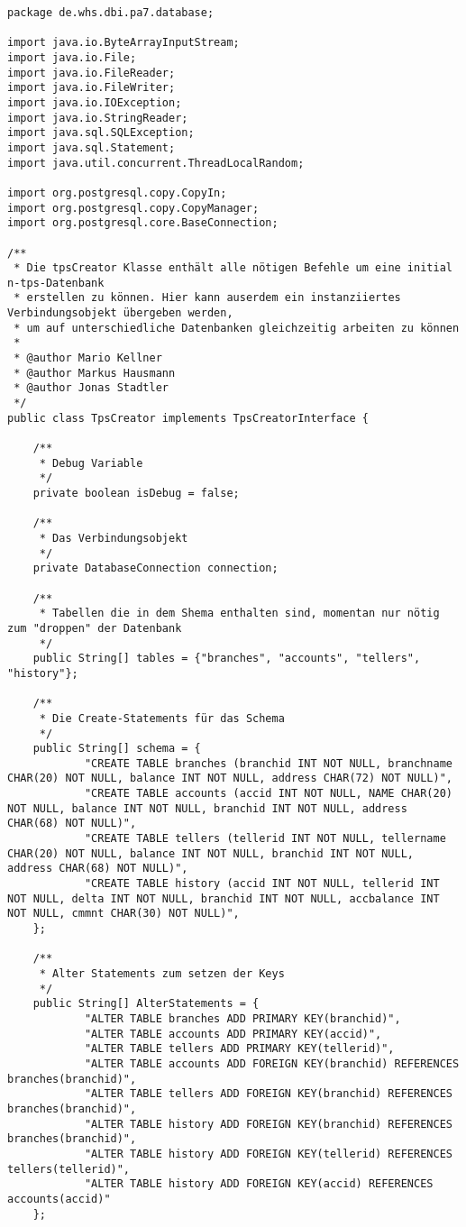 \begin{lstlisting}[caption={tpsCreator (optimiert)}, label={lst:tpsv2}]
package de.whs.dbi.pa7.database;

import java.io.ByteArrayInputStream;
import java.io.File;
import java.io.FileReader;
import java.io.FileWriter;
import java.io.IOException;
import java.io.StringReader;
import java.sql.SQLException;
import java.sql.Statement;
import java.util.concurrent.ThreadLocalRandom;

import org.postgresql.copy.CopyIn;
import org.postgresql.copy.CopyManager;
import org.postgresql.core.BaseConnection;

/**
 * Die tpsCreator Klasse enthält alle nötigen Befehle um eine initial n-tps-Datenbank
 * erstellen zu können. Hier kann auserdem ein instanziiertes Verbindungsobjekt übergeben werden,
 * um auf unterschiedliche Datenbanken gleichzeitig arbeiten zu können
 * 
 * @author Mario Kellner
 * @author Markus Hausmann
 * @author Jonas Stadtler
 */
public class TpsCreator implements TpsCreatorInterface {
	
	/**
	 * Debug Variable
	 */
	private boolean isDebug = false;
	
	/**
	 * Das Verbindungsobjekt
	 */
	private DatabaseConnection connection;
	
	/**
	 * Tabellen die in dem Shema enthalten sind, momentan nur nötig zum "droppen" der Datenbank
	 */
	public String[] tables = {"branches", "accounts", "tellers", "history"};
	
	/**
	 * Die Create-Statements für das Schema
	 */
	public String[] schema = {
			"CREATE TABLE branches (branchid INT NOT NULL, branchname CHAR(20) NOT NULL, balance INT NOT NULL, address CHAR(72) NOT NULL)",
			"CREATE TABLE accounts (accid INT NOT NULL, NAME CHAR(20) NOT NULL, balance INT NOT NULL, branchid INT NOT NULL, address CHAR(68) NOT NULL)",
			"CREATE TABLE tellers (tellerid INT NOT NULL, tellername CHAR(20) NOT NULL, balance INT NOT NULL, branchid INT NOT NULL, address CHAR(68) NOT NULL)",
			"CREATE TABLE history (accid INT NOT NULL, tellerid INT NOT NULL, delta INT NOT NULL, branchid INT NOT NULL, accbalance INT NOT NULL, cmmnt CHAR(30) NOT NULL)",
	};
	
	/**
	 * Alter Statements zum setzen der Keys
	 */
	public String[] AlterStatements = {
			"ALTER TABLE branches ADD PRIMARY KEY(branchid)",
			"ALTER TABLE accounts ADD PRIMARY KEY(accid)",
			"ALTER TABLE tellers ADD PRIMARY KEY(tellerid)",
			"ALTER TABLE accounts ADD FOREIGN KEY(branchid) REFERENCES branches(branchid)",
			"ALTER TABLE tellers ADD FOREIGN KEY(branchid) REFERENCES branches(branchid)",
			"ALTER TABLE history ADD FOREIGN KEY(branchid) REFERENCES branches(branchid)",
			"ALTER TABLE history ADD FOREIGN KEY(tellerid) REFERENCES tellers(tellerid)",
			"ALTER TABLE history ADD FOREIGN KEY(accid) REFERENCES accounts(accid)"
	};


\end{lstlisting}
